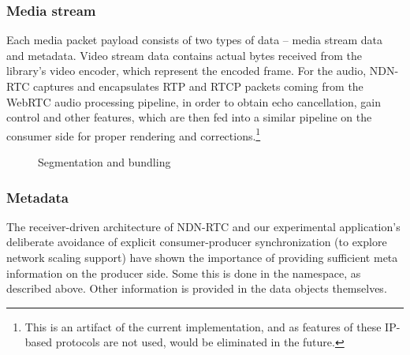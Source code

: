 \documentclass{icn/sig-alternate-2012} %
\newcommand{\ndnrtcName}{NDN-RTC} %
\begin{document}
\subsubsection{Media stream}
Each media packet payload consists of two types of data -- media stream data and metadata. Video stream data contains actual bytes received from the library's video encoder, which represent the encoded frame. For the audio, \ndnrtcName{} captures and encapsulates RTP and RTCP packets coming from the WebRTC audio processing pipeline, in order to obtain echo cancellation, gain control and other features, which are then fed into a similar pipeline on the consumer side for proper rendering and corrections.\footnote{This is an artifact of the current implementation, and as features of these IP-based protocols are not used, would be eliminated in the future.}


\begin{figure}[t!]
\centering
{}
\caption{Segmentation and bundling}
\end{figure}

\subsubsection{Metadata}

The receiver-driven architecture of \ndnrtcName{} and our experimental application's deliberate avoidance of explicit consumer-producer synchronization (to explore network scaling support) have shown the importance of providing sufficient meta information on the producer side. Some this is done in the namespace, as described above.  Other information is provided in the data objects themselves. 
\end{document}
